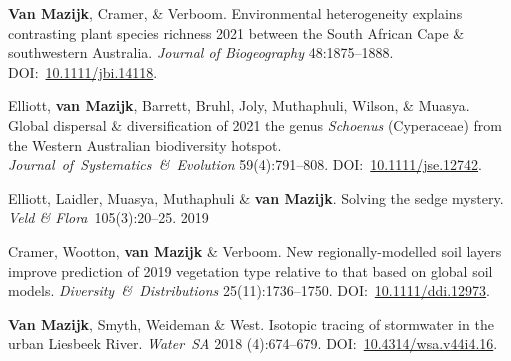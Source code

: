 \begin{hangparas}{2em}{1}

\textbf{Van Mazijk}, Cramer, \& Verboom.
Environmental heterogeneity explains contrasting plant species richness
                                                              \hfill 2021 \break
between the South African Cape \& southwestern Australia.
\textit{Journal of Biogeography}
48:1875--1888.                                                            \break
DOI:~\href{https://doi.org/10.1111/jbi.14118}{10.1111/jbi.14118}.

Elliott, \textbf{van Mazijk}, Barrett, Bruhl,
Joly, Muthaphuli, Wilson, \& Muasya.
Global dispersal \& diversification of                        \hfill 2021 \break
the genus \textit{Schoenus} (Cyperaceae)
from the Western Australian biodiversity hotspot.                         \break
\textit{Journal~of~Systematics~\&~Evolution}
59(4):791--808.
DOI:~\href{https://doi.org/10.1111/jse.1274}{10.1111/jse.12742}.

Elliott, Laidler, Muasya, Muthaphuli \& \textbf{van Mazijk}.
Solving the sedge mystery.
\textit{Veld \& Flora}~105(3):20--25.                         \hfill 2019

Cramer, Wootton, \textbf{van Mazijk} \& Verboom.
New regionally-modelled soil layers improve prediction of     \hfill 2019 \break
vegetation type relative to that based on global soil models.
\textit{Diversity~\&~Distributions}
25(11):1736--1750.                                                        \break
DOI:~\href{https://doi.org/10.1111/ddi.12973}{10.1111/ddi.12973}.

\textbf{Van Mazijk}, Smyth, Weideman \& West.
Isotopic tracing of stormwater in the urban Liesbeek River.
\textit{Water~SA}                                             \hfill 2018 (4):674--679.
DOI:~\href{https://doi.org/10.4314/wsa.v44i4.16}{10.4314/wsa.v44i4.16}.

\hfill

\end{hangparas}
